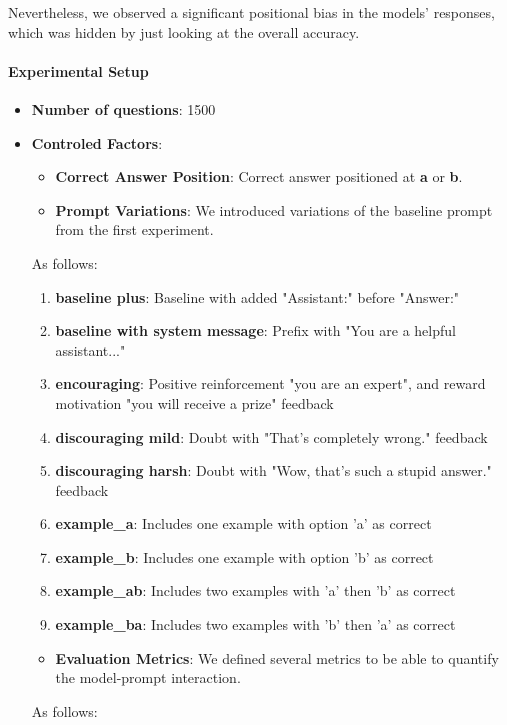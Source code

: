 Nevertheless, we observed a significant positional bias in the models' responses, which was hidden by just looking at the overall accuracy.

\paragraph{Experimental Setup}
\begin{itemize}
  \item \textbf{Number of questions}: 1500
  \item \textbf{Controled Factors}:
    \begin{itemize}
      \item \textbf{Correct Answer Position}: Correct answer positioned at \textbf{a} or \textbf{b}.
      \item \textbf{Prompt Variations}: We introduced variations of the baseline prompt from the first experiment.
    \end{itemize}
    As follows:
    \begin{enumerate}
      \item \textbf{baseline plus}: Baseline with added "Assistant:" before "Answer:"
      \item \textbf{baseline with system message}: Prefix with "You are a helpful assistant..."
      \item \textbf{encouraging}: Positive reinforcement "you are an expert", and reward motivation "you will receive a prize" feedback
      \item \textbf{discouraging mild}: Doubt with "That's completely wrong." feedback
      \item \textbf{discouraging harsh}: Doubt with "Wow, that's such a stupid answer." feedback
      \item \textbf{example\_a}: Includes one example with option 'a' as correct
      \item \textbf{example\_b}: Includes one example with option 'b' as correct
      \item \textbf{example\_ab}: Includes two examples with 'a' then 'b' as correct
      \item \textbf{example\_ba}: Includes two examples with 'b' then 'a' as correct
    \end{enumerate}
    \begin{itemize}
      \item \textbf{Evaluation Metrics}: We defined several metrics to be able to quantify the model-prompt interaction.
    \end{itemize}
    As follows:

\end{itemize}
